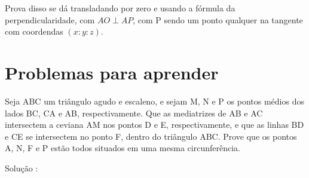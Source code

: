 \documentclass{article}
\begin{document}
Prova disso se dá transladando  por zero e usando a fórmula da perpendicularidade, com $AO \perp 
AP$, com P sendo um ponto qualquer na tangente com coordendas $(x:y:z)$.

\section{Problemas para aprender}

\begin{tcolorbox}[colback=purple!5!white,colframe=purple!75!black,title=Problema para aprender\emoji{goblin}]
Seja ABC um triângulo agudo e escaleno, e sejam M, N e P os pontos médios dos lados BC, CA e AB, respectivamente. Que as mediatrizes de AB e AC intersectem a ceviana AM nos pontos D e E, respectivamente, e que as linhas BD e CE se intersectem no ponto F, dentro do triângulo ABC. Prove que os pontos A, N, F e P estão todos situados em uma mesma circunferência.
\end{tcolorbox}
Solução : 
\end{document}
